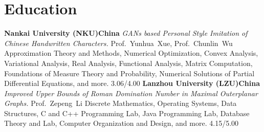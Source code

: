 \documentclass[11pt,a4paper, final]{moderncv}
\begin{document}
\clearpage
\maketitle
\section{\textbf{Education}}
	{\textbf{Nankai University (NKU)}}{}{\textbf{China}}{}
	{\emph{GANs based Personal Style Imitation of Chinese Handwritten Characters.}}
	{Prof.~Yunhua~Xue, Prof.~Chunlin~Wu}
	{Approximation Theory and Methods, Numerical Optimization, Convex Analysis, 
	Variational Analysis, Real Analysis, Functional Analysis, Matrix Computation, 
	Foundations of Measure Theory and Probability, Numerical Solutions of Partial Differential Equations, and more.}
	{3.06/4.00}
	{\textbf{Lanzhou University (LZU)}}{}{\textbf{China}}{}
	{\emph{Improved Upper Bounds of Roman Domination Number in Maximal Outerplanar Graphs.}}
	{Prof.~Zepeng~Li}
	{Discrete Mathematics, Operating Systems, Data Structures, C and C++ Programming Lab, 
	Java Programming Lab, Database Theory and Lab, Computer Organization and Design, and more.}
	{4.15/5.00}
\end{document}
